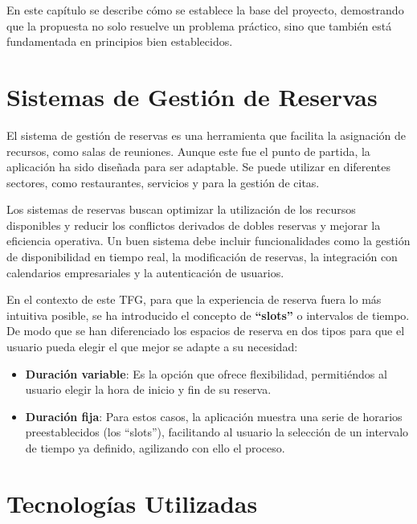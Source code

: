
En este capítulo se describe cómo se establece la base del proyecto, demostrando que la propuesta no solo resuelve un problema práctico, sino que también está fundamentada en principios bien establecidos.

\section{Sistemas de Gestión de Reservas}

El sistema de gestión de reservas es una herramienta que facilita la asignación de recursos, como salas de reuniones. Aunque este fue el punto de partida, la aplicación ha sido diseñada para ser adaptable. Se puede utilizar en diferentes sectores, como restaurantes, servicios y para la gestión de citas.

Los sistemas de reservas buscan optimizar la utilización de los recursos disponibles y reducir los conflictos derivados de dobles reservas y mejorar la eficiencia operativa. Un buen sistema debe incluir funcionalidades como la gestión de disponibilidad en tiempo real, la modificación de reservas, la integración con calendarios empresariales y la autenticación de usuarios.

En el contexto de este TFG, para que la experiencia de reserva fuera lo más intuitiva posible, se ha introducido el concepto de \textbf{``slots''} o intervalos de tiempo. De modo que se han diferenciado los espacios de reserva en dos tipos para que el usuario pueda elegir el que mejor se adapte a su necesidad:
\begin{itemize}
\tightlist
   \item \textbf{Duración variable}: Es la opción que ofrece flexibilidad, permitiéndos al usuario elegir la hora de inicio y fin de su reserva.
   \item \textbf{Duración fija}: Para estos casos, la aplicación muestra una serie de horarios preestablecidos (los ``slots''), facilitando al usuario la selección de un intervalo de tiempo ya definido, agilizando con ello el proceso.
\end{itemize}

\section{Tecnologías Utilizadas}
